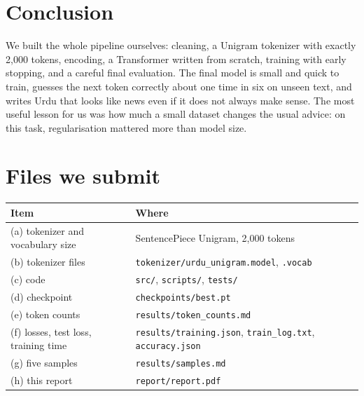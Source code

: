 \documentclass[11pt,a4paper]{article}
\begin{document}
\section{Conclusion}

We built the whole pipeline ourselves: cleaning, a Unigram tokenizer with exactly 2{,}000 tokens, encoding, a Transformer written from scratch, training with early stopping, and a careful final evaluation. The final model is small and quick to train, guesses the next token correctly about one time in six on unseen text, and writes Urdu that looks like news even if it does not always make sense. The most useful lesson for us was how much a small dataset changes the usual advice: on this task, regularisation mattered more than model size.

\appendix
\section{Files we submit}

\begin{tabular}{ll}
\toprule
Item & Where \\
\midrule
(a) tokenizer and vocabulary size & SentencePiece Unigram, 2{,}000 tokens \\
(b) tokenizer files & \texttt{tokenizer/urdu\_unigram.model}, \texttt{.vocab} \\
(c) code & \texttt{src/}, \texttt{scripts/}, \texttt{tests/} \\
(d) checkpoint & \texttt{checkpoints/best.pt} \\
(e) token counts & \texttt{results/token\_counts.md} \\
(f) losses, test loss, training time & \texttt{results/training.json}, \texttt{train\_log.txt}, \texttt{accuracy.json} \\
(g) five samples & \texttt{results/samples.md} \\
(h) this report & \texttt{report/report.pdf} \\
\bottomrule
\end{tabular}
\end{document}
